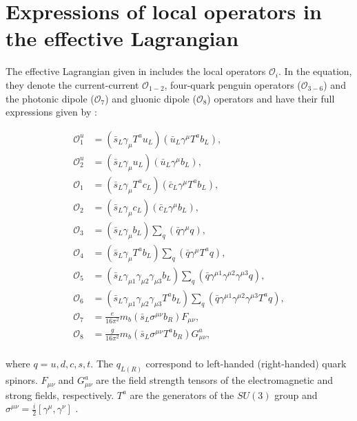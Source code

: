 \chapter{Expressions of local operators in the effective Lagrangian}\label{sec:appendix_local_opperators}

The effective Lagrangian given in  includes the local operators $\mathcal{O}_i$.
In the equation, they denote the current-current $\mathcal{O}_{1-2}$, four-quark penguin operators ($\mathcal{O}_{3-6}$) and the photonic dipole ($\mathcal{O}_{7}$) and gluonic dipole ($\mathcal{O}_{8}$) operators \cite{Misiak:2015xwa} and have their full expressions given by \cite{Kaminski:2012eb,Chetyrkin:1996vx}:

\begin{align*}
    \mathcal{O}_1^u & = (\bar{s}_L\gamma_\mu T^a u_L)(\bar{u}_L\gamma^\mu T^a b_L), \\
    \mathcal{O}_2^u & = (\bar{s}_L\gamma_\mu u_L)(\bar{u}_L\gamma^\mu b_L),\\ 
    \mathcal{O}_1 &   = (\bar{s}_L\gamma_\mu T^a c_L)(\bar{c}_L\gamma^\mu T^a b_L),\\ 
    \mathcal{O}_2 &   = (\bar{s}_L\gamma_\mu c_L)(\bar{c}_L\gamma^\mu b_L),\\ 
    \mathcal{O}_3 &   = (\bar{s}_L\gamma_\mu b_L)\sum_q(\bar{q}\gamma^{\mu}q),\\ 
    \mathcal{O}_4 &   = (\bar{s}_L\gamma_\mu T^a b_L)\sum_q(\bar{q}\gamma^{\mu}T^a q),\\ 
    \mathcal{O}_5 &   = (\bar{s}_L\gamma_{\mu 1}\gamma_{\mu 2}\gamma_{\mu 3}  b_L)\sum_q(\bar{q}\gamma^{\mu 1}\gamma^{\mu 2}\gamma^{\mu 3} q),\\
    \mathcal{O}_6 &   = (\bar{s}_L\gamma_{\mu 1}\gamma_{\mu 2}\gamma_{\mu 3} T^a b_L)\sum_q(\bar{q}\gamma^{\mu 1}\gamma^{\mu 2}\gamma^{\mu 3}T^a q),\\
    \mathcal{O}_7 &   =  \frac{e}{16\pi^2}m_b(\bar{s}_L\sigma^{\mu\nu}b_R)F_{\mu\nu},\\ 
    \mathcal{O}_8 &   =  \frac{g}{16\pi^2}m_b(\bar{s}_L\sigma^{\mu\nu}T^a b_R)G^a_{\mu\nu},\\ 
\end{align*}

where $q=u,d,c,s,t$. The $q_{L(R)}$ correspond to left-handed (right-handed) quark spinors.
$F_{\mu\nu}$ and $G^a_{\mu\nu}$ are the field strength tensors of the electromagnetic and strong fields, respectively.
$T^a$ are the generators of the $SU(3)$ group and $\sigma^{\mu\nu}=\frac{i}{2}[\gamma^{\mu},\gamma^{\nu}]$ \cite{Peskin:1995ev}.
